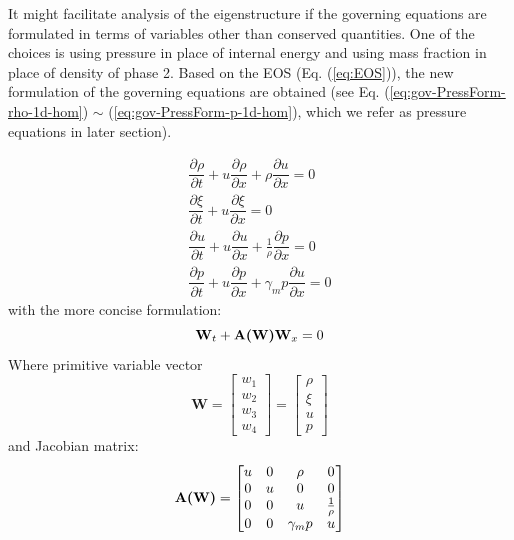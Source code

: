 It might facilitate analysis of the eigenstructure if the governing equations are formulated in terms of variables other than conserved quantities. One of the choices is using pressure in place of internal energy and using mass fraction in place of density of phase 2. Based on the EOS (Eq. (\ref{eq:EOS})), the new formulation of the governing equations are obtained (see Eq. (\ref{eq:gov-PressForm-rho-1d-hom}) $\sim$ (\ref{eq:gov-PressForm-p-1d-hom}), which we refer as pressure equations in later section).

\begin{eqnarray}
\dfrac{\partial \rho}{\partial t} + u \dfrac{\partial \rho} {\partial x} + \rho \dfrac{\partial u} {\partial x}= 0 \label{eq:gov-PressForm-rho-1d-hom} \\
\dfrac{\partial \xi}{\partial t} + u \dfrac{\partial \xi} {\partial x}= 0 \label{eq:gov-PressForm-ks-1d-hom}\\
\dfrac{\partial u}{\partial t} + u \dfrac{\partial u} {\partial x} + \frac{1}{\rho} \dfrac{\partial p} {\partial x}= 0 \label{eq:gov-PressForm-v-1d-hom} \\
\dfrac{\partial p}{\partial t} + u \dfrac{\partial p} {\partial x} + \gamma_m p \dfrac{\partial u} {\partial x} = 0 \label{eq:gov-PressForm-p-1d-hom}
\end{eqnarray}
with the more concise formulation: 
\begin{equation}
\textbf{W}_t + \textbf{A(\textbf{W})} \textbf{W}_x = 0
\end{equation}
Where primitive variable vector
\begin{equation}
   \textbf{W}=\begin{bmatrix}
         w_1 \\
         w_2 \\
         w_3 \\
         w_4
     \end{bmatrix}
    =\begin{bmatrix}
         \rho \\
         \xi \\
         u   \\
         p
     \end{bmatrix}
\end{equation}
and Jacobian matrix: 
\begin{equation}
   \textbf{A(\textbf{W})}=\begin{bmatrix}
         u & 0 & \rho       & 0 \\
         0 & u & 0          & 0 \\
         0 & 0 & u          &\frac{1}{\rho} \\
         0 & 0 & \gamma_m p & u
     \end{bmatrix}
\end{equation}
